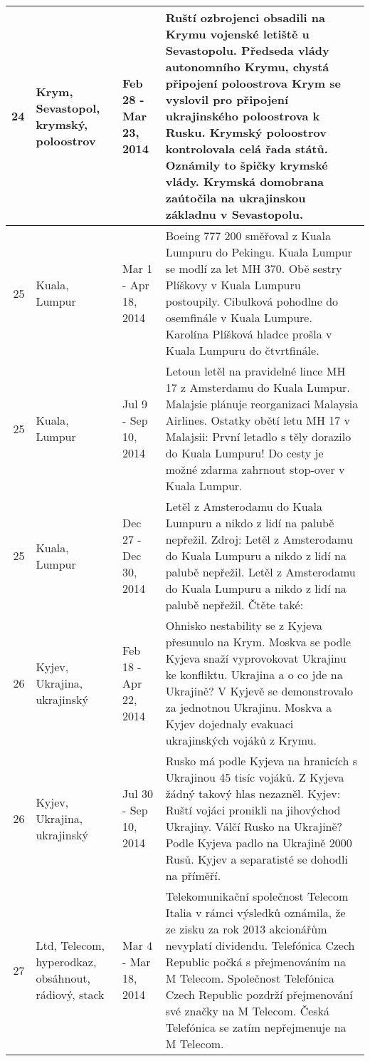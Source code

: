 \begin{tabularx}{\linewidth}{r m{2.5cm} X m{8cm}}
24 & Krym, Sevastopol, krymský, poloostrov & Feb 28 - Mar 23, 2014 & Ruští ozbrojenci obsadili na Krymu vojenské letiště u Sevastopolu. Předseda vlády autonomního Krymu, chystá připojení poloostrova Krym se vyslovil pro připojení ukrajinského poloostrova k Rusku. Krymský poloostrov kontrolovala celá řada států. Oznámily to špičky krymské vlády. Krymská domobrana zaútočila na ukrajinskou základnu v Sevastopolu. \\ \midrule
25 & Kuala, Lumpur & Mar 1 - Apr 18, 2014 & Boeing 777 200 směřoval z Kuala Lumpuru do Pekingu. Kuala Lumpur se modlí za let MH 370. Obě sestry Plíškovy v Kuala Lumpuru postoupily. Cibulková pohodlne do osemfinále v Kuala Lumpure. Karolína Plíšková hladce prošla v Kuala Lumpuru do čtvrtfinále. \\ \midrule
25 & Kuala, Lumpur & Jul 9 - Sep 10, 2014 & Letoun letěl na pravidelné lince MH 17 z Amsterdamu do Kuala Lumpur. Malajsie plánuje reorganizaci Malaysia Airlines. Ostatky obětí letu MH 17 v Malajsii: První letadlo s těly dorazilo do Kuala Lumpuru! Do cesty je možné zdarma zahrnout stop-over v Kuala Lumpur. \\ \midrule
25 & Kuala, Lumpur & Dec 27 - Dec 30, 2014 & Letěl z Amsterodamu do Kuala Lumpuru a nikdo z lidí na palubě nepřežil. Zdroj: Letěl z Amsterodamu do Kuala Lumpuru a nikdo z lidí na palubě nepřežil. Letěl z Amsterodamu do Kuala Lumpuru a nikdo z lidí na palubě nepřežil. Čtěte také: \\ \midrule
26 & Kyjev, Ukrajina, ukrajinský & Feb 18 - Apr 22, 2014 & Ohnisko nestability se z Kyjeva přesunulo na Krym. Moskva se podle Kyjeva snaží vyprovokovat Ukrajinu ke konfliktu. Ukrajina a o co jde na Ukrajině? V Kyjevě se demonstrovalo za jednotnou Ukrajinu. Moskva a Kyjev dojednaly evakuaci ukrajinských vojáků z Krymu. \\ \midrule
26 & Kyjev, Ukrajina, ukrajinský & Jul 30 - Sep 10, 2014 & Rusko má podle Kyjeva na hranicích s Ukrajinou 45 tisíc vojáků. Z Kyjeva žádný takový hlas nezazněl. Kyjev: Ruští vojáci pronikli na jihovýchod Ukrajiny. Válčí Rusko na Ukrajině? Podle Kyjeva padlo na Ukrajině 2000 Rusů. Kyjev a separatisté se dohodli na příměří. \\ \midrule
27 & Ltd, Telecom, hyperodkaz, obsáhnout, rádiový, stack & Mar 4 - Mar 18, 2014 & Telekomunikační společnost Telecom Italia v rámci výsledků oznámila, že ze zisku za rok 2013 akcionářům nevyplatí dividendu. Telefónica Czech Republic počká s přejmenováním na M Telecom. Společnost Telefónica Czech Republic pozdrží přejmenování své značky na M Telecom. Česká Telefónica se zatím nepřejmenuje na M Telecom. \\ \midrule

\end{tabularx}
